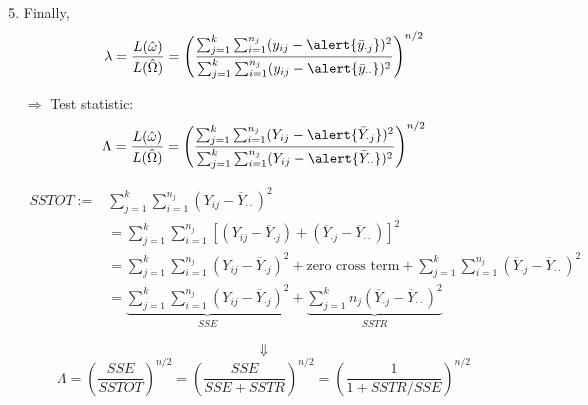 \begin{frame}[fragile]

	\begin{enumerate}
		\setcounter{enumi}{4}
		\item Finally,
			\vfill
			\[
				\lambda =  \frac{L(\hat\omega)}{L(\hat\Omega)} =
				\left(  \frac{\sum_{j=1}^k\sum_{i=1}^{n_j}(y_{ij}-\alert{\bar{y}_{\cdot j}})^2}{\sum_{j=1}^k\sum_{i=1}^{n_j}(y_{ij}-\alert{\bar{y}_{\cdot \cdot}})^2}\right )^{n/2}
			\]
			\vfill
		\item[$\Rightarrow$] Test statistic:
			\vfill
			\[
				\Lambda =  \frac{L(\hat\omega)}{L(\hat\Omega)} =
				\left(  \frac{\sum_{j=1}^k\sum_{i=1}^{n_j}(Y_{ij}-\alert{\bar{Y}_{\cdot j}})^2}{\sum_{j=1}^k\sum_{i=1}^{n_j}(Y_{ij}-\alert{\bar{Y}_{\cdot \cdot}})^2}\right )^{n/2}
			\]
	\end{enumerate}
\end{frame}
\begin{frame}[fragile]

	\begin{enumerate}
		\item[]
	\begin{align*}
		SSTOT := & \sum_{j=1}^k\sum_{i=1}^{n_j} \left(Y_{ij}-\overline{Y}_{\cdot\cdot} \right)^2
		     \\ & =  \sum_{j=1}^k\sum_{i=1}^{n_j}\left[ \left(Y_{ij}-\overline{Y}_{\cdot j} \right)+\left(\overline{Y}_{\cdot j} - \overline{Y}_{\cdot\cdot}\right)\right]^2
		     \\ & =  \sum_{j=1}^k\sum_{i=1}^{n_j}\left(Y_{ij}-\overline{Y}_{\cdot j} \right)^2+ \text{zero cross term}+\sum_{j=1}^k\sum_{i=1}^{n_j}\left(\overline{Y}_{\cdot j} - \overline{Y}_{\cdot\cdot}\right)^2
		     \\ & =  \underbrace{\sum_{j=1}^k\sum_{i=1}^{n_j}\left(Y_{ij}-\overline{Y}_{\cdot j} \right)^2}_{\displaystyle SSE }+\underbrace{\sum_{j=1}^{k}n_j \left(\overline{Y}_{\cdot j} - \overline{Y}_{\cdot\cdot}\right)^2}_{\displaystyle SSTR}
	\end{align*}
\item[]
	\vfill
	\[\Downarrow\]
	\vfill
	\[
		\Lambda = \left(  \frac{SSE}{SSTOT}\right )^{n/2}
		= \left(  \frac{SSE}{SSE+SSTR}\right )^{n/2}
		= \left(  \frac{1}{1+SSTR/SSE}\right )^{n/2}
	\]
	\end{enumerate}
\end{frame}
